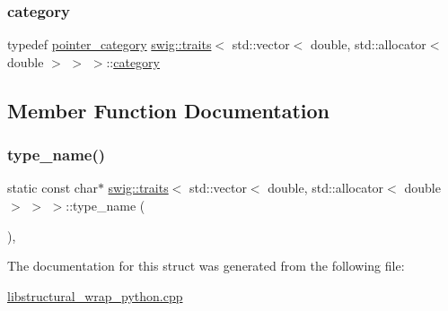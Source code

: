 \subsubsection{\texorpdfstring{category}{category}}
{\footnotesize\ttfamily typedef \hyperlink{structswig_1_1pointer__category}{pointer\+\_\+category} \hyperlink{structswig_1_1traits}{swig\+::traits}$<$ std\+::vector$<$ double, std\+::allocator$<$ double $>$ $>$ $>$\+::\hyperlink{structswig_1_1traits_3_01std_1_1vector_3_01double_00_01std_1_1allocator_3_01double_01_4_01_4_01_4_a70c608477567968995b8654448121595}{category}}



\subsection{Member Function Documentation}
\mbox{\label{structswig_1_1traits_3_01std_1_1vector_3_01double_00_01std_1_1allocator_3_01double_01_4_01_4_01_4_aa34cfd8fe03073e6f32fc33cf48a5cf3}} 
\subsubsection{\texorpdfstring{type\+\_\+name()}{type\_name()}}
{\footnotesize\ttfamily static const char$\ast$ \hyperlink{structswig_1_1traits}{swig\+::traits}$<$ std\+::vector$<$ double, std\+::allocator$<$ double $>$ $>$ $>$\+::type\+\_\+name (\begin{DoxyParamCaption}{ }\end{DoxyParamCaption})\hspace{0.3cm}{\ttfamily [inline]}, {\ttfamily [static]}}



The documentation for this struct was generated from the following file\+:\begin{DoxyCompactItemize}
\item 
\hyperlink{libstructural__wrap__python_8cpp}{libstructural\+\_\+wrap\+\_\+python.\+cpp}\end{DoxyCompactItemize}
